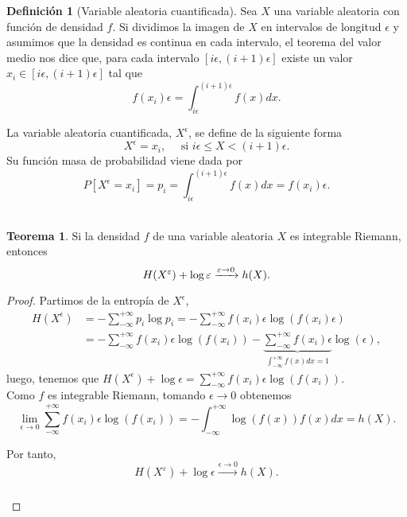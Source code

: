 \documentclass[12pt,a4paper]{report} %
\theoremstyle{definition}
\newtheorem{definition}{Definición}[section]
\newtheorem{theorem}{Teorema}[section]
\begin{document}
\begin{definition}[Variable aleatoria cuantificada]
  Sea $X$ una variable aleatoria con función de densidad $f$. Si dividimos la imagen de $X$ en intervalos de longitud $\epsilon$ y asumimos que la densidad es continua en cada intervalo, el teorema del valor medio nos dice que, para cada intervalo $\left[i\epsilon, (i+1)\epsilon\right]$ existe un valor $x_i\in \left[i\epsilon, (i+1)\epsilon\right]$ tal que \[f(x_i)\epsilon = \int_{i\epsilon}^{(i+1)\epsilon}f(x)dx.\]
  
  La variable aleatoria cuantificada, $X^{\epsilon}$, se define de la siguiente forma\[
X^{\epsilon} = x_i, \quad \text{ si } i\epsilon \leq X  < (i+1)\epsilon.
\]Su función masa de probabilidad viene dada por \[
P[X^\epsilon = x_i] = p_i =  \int_{i\epsilon}^{(i+1)\epsilon}f(x)dx = f(x_i)\epsilon.
\]\\[-10pt]
\end{definition}

\begin{theorem}
  Si la densidad $f$ de una variable aleatoria $X$ es integrable Riemann, entonces\[
H(X^{\varepsilon}) + \log \epsilon \xrightarrow[]{\epsilon \to 0}  h(X).\\
  \] 
\end{theorem}
\begin{proof}
  Partimos de la entropía de $X^{\epsilon}$,
  \begin{align*}
    H(X^{\epsilon}) &= - \sum_{-\infty}^{+\infty} p_i \log p_i = - \sum_{-\infty}^{+\infty}f(x_i)\epsilon \log\left ( f(x_i)\epsilon \right )\\
    &= -  \sum_{-\infty}^{+\infty}f(x_i)\epsilon \log\left ( f(x_i) \right ) - \underbrace{\sum_{-\infty}^{+\infty}f(x_i)\epsilon}_{\int_{-\infty}^{+\infty}f(x)dx=1} \log\left ( \epsilon \right ),
  \end{align*}
  luego, tenemos que $H(X^{\epsilon}) + \log \epsilon  = \sum_{-\infty}^{+\infty}f(x_i)\epsilon \log\left ( f(x_i) \right )$.\\

  Como $f$ es integrable Riemann, tomando $\epsilon \to 0$ obtenemos \[\lim_{\epsilon \to 0}\sum_{-\infty}^{+\infty}f(x_i)\epsilon \log\left ( f(x_i) \right )  = - \int_{-\infty}^{+\infty}\log\left( f(x)\right) f(x)dx = h(X).\]

  Por tanto,\[
H(X^{\varepsilon}) + \log \epsilon \xrightarrow[]{\epsilon \to 0}  h(X).
  \] \\[-10pt]
\end{proof}
\end{document}
